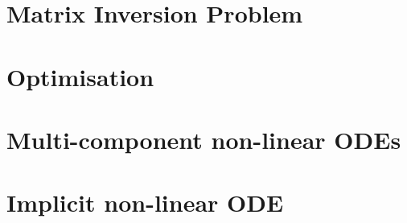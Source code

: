 \documentclass[../main.tex]{subfiles}
\begin{document}
    \newpage

    \chapter{Matrix Inversion Problem}\label{ch:matrix-inversion-problem}
    

    \newpage

    \chapter{Optimisation}\label{ch:optimisation}
    

    \newpage

    \chapter{Multi-component non-linear ODEs}\label{ch:multi-component-non-linear-odes}
    

    \newpage

    \chapter{Implicit non-linear ODE}\label{ch:implicit-non-linear-ode}
    
\end{document}
